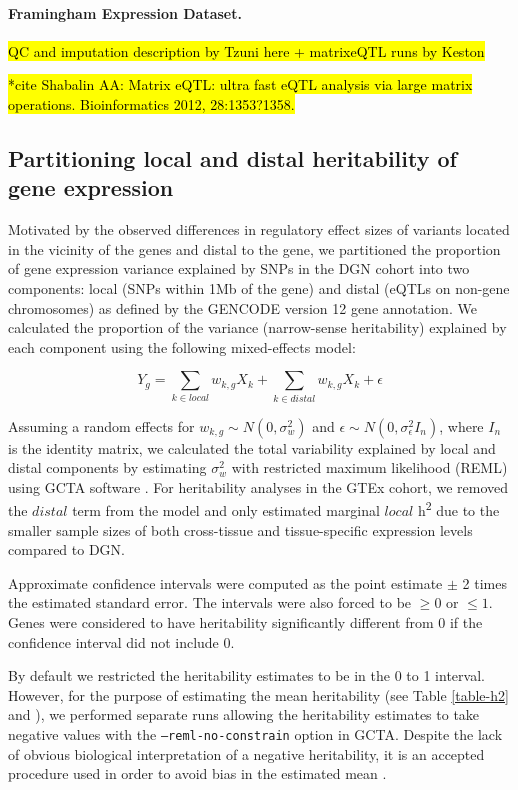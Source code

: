 \documentclass[10pt,letterpaper]{article}
\begin{document}
\paragraph*{Framingham Expression Dataset.}\label{framingham-dataset}

\hl{QC and imputation description by Tzuni here + matrixeQTL runs by Keston}

\hl{*cite Shabalin AA: Matrix eQTL: ultra fast eQTL analysis via large matrix operations. Bioinformatics 2012, 28:1353?1358.}

\subsection*{Partitioning local and distal heritability of gene
expression}\label{partitioning-local-and-distal-heritability-of-gene-expression}

Motivated by the observed differences in regulatory effect sizes of variants located in the vicinity of the genes and distal to the gene,
we partitioned the proportion of gene expression variance explained by
SNPs in the DGN cohort into two components: local (SNPs within 1Mb of
the gene) and distal (eQTLs on non-gene chromosomes) as defined by the
GENCODE \cite{Harrow_2012} version 12 gene annotation. We calculated the
proportion of the variance (narrow-sense heritability) explained by each
component using the following mixed-effects model:

\[ Y_g = \sum_{k  \in local}w_{k,g} X_k + \sum_{k  \in distal}w_{k,g} X_k + \epsilon \]

Assuming a random effects for \(w_{k,g} \sim N(0, \sigma^2_w)\) and
\(\epsilon \sim N(0, \sigma^2_{\epsilon} I_n)\), where \(I_n\) is the
identity matrix, we calculated the total variability explained by local
and distal components by estimating \(\sigma^2_w\) with restricted
maximum likelihood (REML) using GCTA software \cite{Yang_2011}. For heritability
analyses in the GTEx cohort, we removed the \(distal\) term from the
model and only estimated marginal \(local\) h\textsuperscript{2} due to
the smaller sample sizes of both cross-tissue and tissue-specific
expression levels compared to DGN. 

Approximate confidence intervals were computed as the point estimate $\pm$ 
2 times the estimated standard error. The intervals were also forced to be $\ge 0 $ or $\le 1$. 
Genes were considered to have heritability significantly different from 0 if the confidence interval did not include 0.

By default we restricted the heritability estimates to be in the 0 to 1 interval. However, 
for the purpose of estimating the mean heritability (see Table \ref{table-h2} and ), we performed separate runs allowing the heritability estimates to 
take negative values with the \texttt{--reml-no-constrain} option in GCTA. Despite the lack of obvious biological interpretation of a negative heritability, 
it is an accepted procedure used in order to avoid bias in the estimated mean \cite{Price_2011,Wright_2014}.
\end{document}
